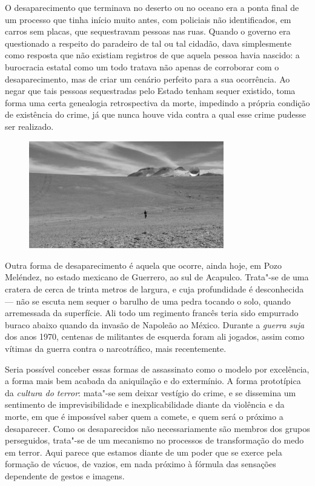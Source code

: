 O desaparecimento que terminava no deserto ou no oceano era a ponta
final de um processo que tinha início muito antes, com policiais não
identificados, em carros sem placas, que sequestravam pessoas nas ruas.
Quando o governo era questionado a respeito do paradeiro de tal ou tal
cidadão, dava simplesmente como resposta que não existiam registros de
que aquela pessoa havia nascido: a burocracia estatal como um todo
tratava não apenas de corroborar com o desaparecimento, mas de criar um
cenário perfeito para a sua ocorrência. Ao negar que tais pessoas
sequestradas pelo Estado tenham sequer existido, toma forma uma certa
genealogia retrospectiva da morte, impedindo a própria condição de
existência do crime, já que nunca houve vida contra a qual esse crime
pudesse ser realizado.

\begin{figure}[!ht]
\centering
 \includegraphics[width=85mm]{./imgs/chile.jpg}
\caption{\tiny{}}
\end{figure}


Outra forma de desaparecimento é aquela que ocorre, ainda hoje, em Pozo
Meléndez, no estado mexicano de Guerrero, ao sul de Acapulco. Trata"-se
de uma cratera de cerca de trinta metros de largura, e cuja profundidade
é desconhecida --- não se escuta nem sequer o barulho de uma pedra tocando
o solo, quando arremessada da superfície. Ali todo um regimento francês
teria sido empurrado buraco abaixo quando da invasão de Napoleão  ao
México. Durante a \emph{guerra suja} dos anos 1970, centenas de
militantes de esquerda foram ali jogados, assim como vítimas da guerra
contra o narcotráfico, mais recentemente.

Seria possível conceber essas formas de assassinato como o modelo por
excelência, a forma mais bem acabada da aniquilação e do extermínio. A
forma prototípica da \emph{cultura do terror}: mata"-se sem deixar vestígio do
crime, e se dissemina um sentimento de imprevisibilidade e
inexplicabilidade diante da violência e da morte, em que é impossível
saber quem a comete, e quem será o próximo a desaparecer. Como os
desaparecidos não necessariamente são membros dos grupos perseguidos,
trata"-se de um mecanismo no processos de transformação do medo em
terror. Aqui parece que estamos diante de um poder que se exerce pela
formação de vácuos, de vazios, em nada próximo à fórmula das sensações
dependente de gestos e imagens.

